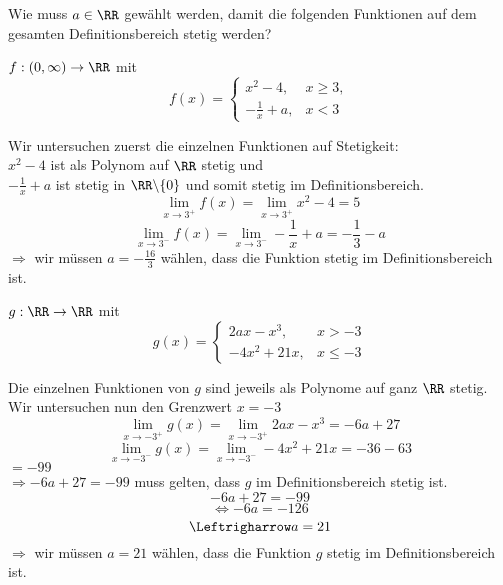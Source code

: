 Wie muss $a\in\RR$ gewählt werden, damit die folgenden Funktionen auf dem gesamten Definitionsbereich stetig werden?

\begin{minipage}[t]{0.5\textwidth}
    \begin{subtask}
        $f:(0,\infty)\to\RR$ mit
        \[
            f(x)=
            \begin{cases}
                x^2-4, & x\geq3,\\
                -\frac{1}{x}+a, & x<3
            \end{cases}
        \]
    \end{subtask}
    \begin{solution}
        Wir untersuchen zuerst die einzelnen Funktionen auf Stetigkeit: \\
        $x^2-4$ ist als Polynom auf $\RR$ stetig und \\
        $-\frac{1}{x}+a$ ist stetig in $\RR\backslash\{0\}$ und somit stetig im Definitionsbereich.
        \[\lim_{x\to3^+}f(x)=\lim_{x\to3^+}x^2-4=5\]
        \[\lim_{x\to3^-}f(x)=\lim_{x\to3^-}-\frac{1}{x}+a=-\frac{1}{3}-a\]
        $\Rightarrow$ wir müssen $a=-\frac{16}{3}$ wählen, dass die Funktion stetig im Definitionsbereich ist.
    \end{solution}
\end{minipage} %
\begin{minipage}[t]{0.5\textwidth}
    \begin{subtask}
        $g:\RR\to\RR$ mit
        \[
            g(x)=
            \begin{cases}
                2ax-x^3, & x>-3 \\
                -4x^2+21x, & x\leq -3
            \end{cases}
        \]
    \end{subtask}
    \begin{solution}
        Die einzelnen Funktionen von $g$ sind jeweils als Polynome auf ganz $\RR$ stetig. Wir untersuchen nun den Grenzwert $x=-3$
        \[\lim_{x\to-3^+}g(x)=\lim_{x\to-3^+}2ax-x^3=-6a+27\]
        \[\lim_{x\to-3^-}g(x)=\lim_{x\to-3^-}-4x^2+21x=-36-63\]
        $=-99$ \\
        $\Rightarrow -6a+27=-99$ muss gelten, dass $g$ im Definitionsbereich stetig ist. 
        \[-6a+27=-99\]
        \[\Leftrightarrow -6a=-126\]
        \[\Leftrigharrow a=21\]
        $\Rightarrow$ wir müssen $a=21$ wählen, dass die Funktion $g$ stetig im Definitionsbereich ist.
    \end{solution}
\end{minipage}